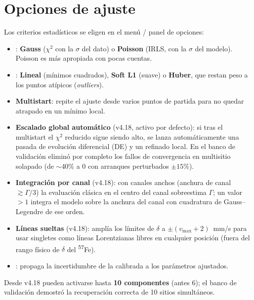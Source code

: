 \section{Opciones de ajuste}
\label{sec:opciones-ajuste}

Los criterios estadísticos se eligen en el menú  / panel de opciones:

\begin{itemize}[nosep]
  \item {}: \textbf{Gauss} ($\chi^2$ con la $\sigma$ del dato) o
        \textbf{Poisson} (IRLS, con la $\sigma$ del modelo). Poisson es más
        apropiada con pocas cuentas.
  \item {}: \textbf{Lineal} (mínimos cuadrados),
        \textbf{Soft L1} (suave) o \textbf{Huber}, que restan peso a los puntos
        atípicos (\emph{outliers}).
  \item \textbf{Multistart}: repite el ajuste desde varios puntos de partida para
        no quedar atrapado en un mínimo local.
  \item \textbf{Escalado global automático} (v4.18, activo por defecto): si tras
        el multistart el $\chi^2$ reducido sigue siendo alto, se lanza
        automáticamente una pasada de evolución diferencial (DE) y un refinado
        local. En el banco de validación eliminó por completo los fallos de
        convergencia en multisitio solapado (de $\sim$40\% a 0 con arranques
        perturbados $\pm 15$\%).
  \item \textbf{Integración por canal} (v4.18): con canales anchos (anchura de
        canal $\gtrsim \Gamma/3$) la evaluación clásica en el centro del canal
        sobreestima $\Gamma$; un valor $>1$ integra el modelo sobre la anchura
        del canal con cuadratura de Gauss--Legendre de ese orden.
  \item \textbf{Líneas sueltas} (v4.18): amplía los límites de $\delta$ a
        $\pm(v_{\max}+2)$~mm/s para usar singletes como líneas Lorentzianas
        libres en cualquier posición (fuera del rango físico de $\delta$ del
        \textsuperscript{57}Fe).
  \item {}: propaga la incertidumbre
        de la  calibrada a los parámetros ajustados.
\end{itemize}

\begin{nota}
Desde v4.18 pueden activarse hasta \textbf{10 componentes} (antes 6); el banco
de validación demostró la recuperación correcta de 10 sitios simultáneos.
\end{nota}

